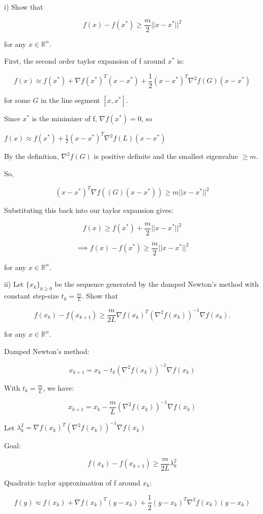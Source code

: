\documentclass{article}
\newcommand{\RR}{\mathbb{R}}
\begin{document}
i) Show that

\[f(x) - f(x^{*}) \geq \frac{m}{2} ||x - x^{*}||^2\]

for any $x \in \RR^n$.


First, the second order taylor expansion of f around $x^{*}$ is:

\[f(x) \approx f(x^{*}) + \nabla f(x^{*})^T (x - x^{*}) + \frac{1}{2} (x - x^{*})^T \nabla^2 f(G)(x - x^{*})\]

for some $G$ in the line segment $[x, x^{*}]$.


Since $x^{*}$ is the minimizer of f, $\nabla f(x^{*}) = 0$, so

$f(x) \approx f(x^{*}) + \frac{1}{2} (x - x^{*})^T \nabla^2 f(L) (x - x^{*})$


By the definition, $\nabla^2 f(G)$ is positive definite and the smallest eigenvalue $\geq m$.

So,


\[(x - x^{*})^T \nabla f((G) (x - x^{*})) \geq m ||x - x^{*}||^2\]

Substituting this back into our taylor expansion gives:

\[f(x) \geq f(x^{*}) + \frac{m}{2} ||x - x^{*}||^2\]

\[\implies f(x) - f(x^{*}) \geq \frac{m}{2} ||x - x^{*}||^2\]

for any $x \in \RR^n$.


ii) Let $\{x_k\}_{k \geq 0}$ be the sequence generated by the damped Newton's
method with constant step-size $t_k = \frac{m}{L}$. Show that

\[f(x_k) - f(x_{k+1}) \geq \frac{m}{2L} \nabla f(x_k)^T (\nabla^2 f(x_k))^{-1} \nabla f(x_k).\]

for any $x \in \RR^n$.


Damped Newton's method:

\[x_{k+1} = x_k - t_k (\nabla^2 f(x_k))^{-1} \nabla f(x_k)\]

With $t_k = \frac{m}{L}$, we have:

\[x_{k+1} = x_k - \frac{m}{L}(\nabla^2 f(x_k))^{-1} \nabla f(x_k)\]

Let $\lambda_k^2 = \nabla f(x_k)^T (\nabla^2 f(x_k))^{-1} \nabla f(x_k)$

Goal:

\[f(x_k) - f(x_{k+1}) \geq \frac{m}{2L} \lambda_k^2\]


Quadratic taylor approximation of f around $x_k$:

\[f(y) \approx f(x_k) + \nabla f(x_k)^T (y - x_k) + \frac{1}{2} (y - x_k)^T \nabla^2 f(x_k) (y - x_k)\]
\end{document}
